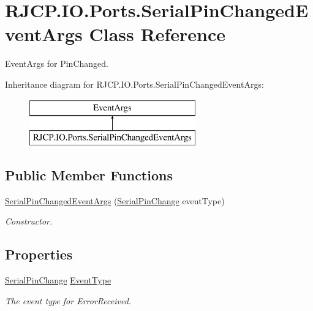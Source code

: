 \hypertarget{class_r_j_c_p_1_1_i_o_1_1_ports_1_1_serial_pin_changed_event_args}{}\section{R\+J\+C\+P.\+I\+O.\+Ports.\+Serial\+Pin\+Changed\+Event\+Args Class Reference}
\label{class_r_j_c_p_1_1_i_o_1_1_ports_1_1_serial_pin_changed_event_args}


Event\+Args for Pin\+Changed.  


Inheritance diagram for R\+J\+C\+P.\+I\+O.\+Ports.\+Serial\+Pin\+Changed\+Event\+Args\+:\begin{figure}[H]
\begin{center}
\leavevmode
\includegraphics[height=2.000000cm]{class_r_j_c_p_1_1_i_o_1_1_ports_1_1_serial_pin_changed_event_args}
\end{center}
\end{figure}
\subsection*{Public Member Functions}
\begin{DoxyCompactItemize}
\item 
\mbox{\hyperlink{class_r_j_c_p_1_1_i_o_1_1_ports_1_1_serial_pin_changed_event_args_a75910dcd8b3dbbf99f17e1e7e000195f}{Serial\+Pin\+Changed\+Event\+Args}} (\mbox{\hyperlink{namespace_r_j_c_p_1_1_i_o_1_1_ports_abe559cc956a8d6ec76d331e52b774a71}{Serial\+Pin\+Change}} event\+Type)
\begin{DoxyCompactList}\small\item\em Constructor. \end{DoxyCompactList}\end{DoxyCompactItemize}
\subsection*{Properties}
\begin{DoxyCompactItemize}
\item 
\mbox{\hyperlink{namespace_r_j_c_p_1_1_i_o_1_1_ports_abe559cc956a8d6ec76d331e52b774a71}{Serial\+Pin\+Change}} \mbox{\hyperlink{class_r_j_c_p_1_1_i_o_1_1_ports_1_1_serial_pin_changed_event_args_a7ab2c61d4f81c542aadf5624165332b0}{Event\+Type}}
\begin{DoxyCompactList}\small\item\em The event type for Error\+Received. \end{DoxyCompactList}\end{DoxyCompactItemize}


